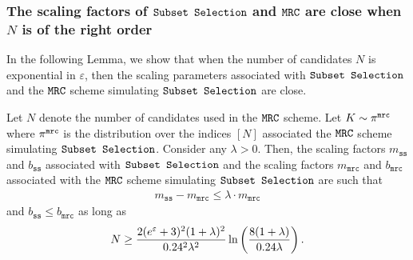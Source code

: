  \subsubsection{The scaling factors of \texorpdfstring{$\texttt{Subset Selection}$}{Subset Selection} and \texorpdfstring{$\texttt{MRC}$}{MRC} are close when \texorpdfstring{$N$}{N} is of the right order}\label{appendix:scaling_mrc_ss}
 In the following Lemma, we show that when the number of candidates $N$ is exponential in $\varepsilon$, then the scaling parameters associated with $\texttt{Subset Selection}$ and the $\texttt{MRC}$ scheme simulating $\texttt{Subset Selection}$ are close.
 
\begin{lemma}\label{lemma:mrc_ss_approximation_error}
Let $N$ denote the number of candidates used in the \emph{$\texttt{MRC}$} scheme. Let $K \sim \pi^{\texttt{mrc}}$ where $\pi^{\texttt{mrc}}$ is the distribution over the indices $[N]$ associated the \emph{$\texttt{MRC}$} scheme simulating \emph{$\texttt{Subset Selection}$}. Consider any $\lambda > 0$.
Then, the scaling factors $m_{\texttt{ss}}$ and $b_{\texttt{ss}}$ associated with \emph{$\texttt{Subset Selection}$} and the scaling factors $m_\texttt{mrc}$ and $b_{\texttt{mrc}}$ associated with the \emph{$\texttt{MRC}$} scheme simulating \emph{$\texttt{Subset Selection}$} are such that
\begin{align}
    m_{\texttt{ss}} - m_\texttt{mrc} \leq \lambda\cdot m_\texttt{mrc}
\end{align}
and $b_{\texttt{ss}} \leq b_\texttt{mrc}$
as long as
\begin{align}
    N\geq \frac{2(e^{\varepsilon}+3)^2(1+\lambda)^2}{0.24^2\lambda^2}\ln\left( \frac{8(1+\lambda)}{0.24\lambda}\right).
\end{align}
\end{lemma}
